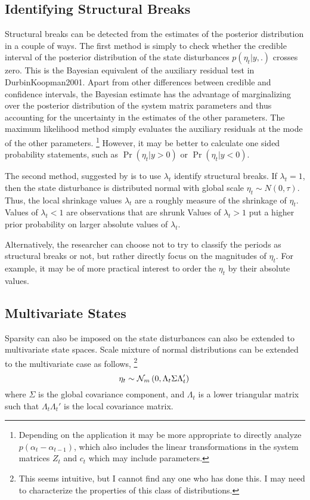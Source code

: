 \documentclass{article}
\newcommand{\paren}[1]{\ensuremath{\left(#1\right)}}
\newcommand{\dmvnorm}[2]{\ensuremath{\mathcal{N}_{#2}\paren{#1}}}
\begin{document}
\subsection{Identifying Structural Breaks}

Structural breaks can be detected from the estimates of the  posterior distribution in a couple of ways.
The first method is simply to check whether the credible interval of the posterior distribution of the state disturbances $p(\eta_{t} | y, .)$ crosses zero.
This is the Bayesian equivalent of the auxiliary residual test in \textcite{JongPenzer1998}{DurbinKoopman2001}.%
Apart from other differences between credible and confidence intervals, the Bayesian estimate has the advantage of marginalizing over the posterior distribution of the system matrix parameters and thus accounting for the  uncertainty in the estimates of the other parameters.
The maximum likelihood method simply evaluates the auxiliary residuals at the mode of the other parameters.%
\footnote{Depending on the application it may be more appropriate to directly analyze $p(\alpha_{t} - \alpha_{t-1})$, which also includes the linear transformations in the system matrices $Z_{t}$ and $c_{t}$ which may include parameters.}
However, it may be better to calculate one sided probability statements, such as $\Pr(\eta_{t} | y > 0)$ or $\Pr(\eta_{t} | y <0)$.

The second method, suggested by \textcite[179-180]{PetrisPetroneEtAl2009} is to use $\lambda_{t}$ identify structural breaks.
If $\lambda_{t} = 1$, then the state disturbance is distributed normal with global scale $\eta_{t} \sim N(0, \tau)$.
Thus, the local shrinkage values $\lambda_{t}$ are a roughly measure of the shrinkage of $\eta_{t}$.
Values of $\lambda_{t} < 1$ are observations that are shrunk
Values of $\lambda_{t} > 1$ put a higher prior probability on larger absolute values of $\lambda_{t}$.

Alternatively, the researcher can choose not to try to classify the periods as structural breaks or not, but rather directly focus on the magnitudes of $\eta_{t}$.
For example, it may be of more practical interest to order the $\eta_{t}$ by their absolute values.

\subsection{Multivariate States}
\label{sec:multivariate}

Sparsity can also be imposed on the  state disturbances can also be extended to multivariate state spaces.
Scale mixture of normal distributions can be extended to the multivariate case as follows,%
\footnote{
  This seems intuitive, but I cannot find any one who has done this.
  I may need to characterize the properties of this class of distributions.
}
\begin{equation}
  \label{eq:12}
  \eta_{t} \sim \dmvnorm{0, \Lambda_{t} \Sigma \Lambda_{t}'}{m} \\
\end{equation}
where $\Sigma$ is the global covariance component, and $\Lambda_{t}$ is a lower triangular matrix such that 
$\Lambda_{t} \Lambda_{t}'$ is the local covariance matrix.
\end{document}

